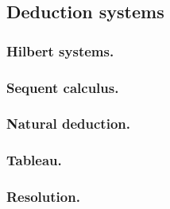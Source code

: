 \subsection{Deduction systems}

\subsubsection{Hilbert systems.}

\subsubsection{Sequent calculus.}

\subsubsection{Natural deduction.}

\subsubsection{Tableau.}

\subsubsection{Resolution.}

